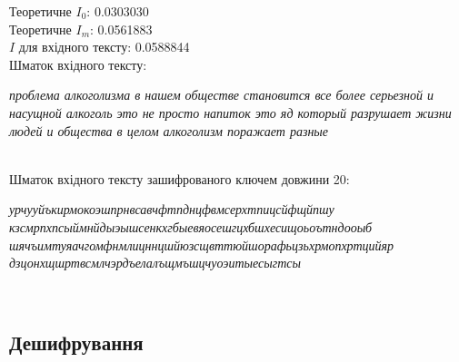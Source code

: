 \documentclass[12pt]{article}
\begin{document}
\quad Теоретичне $I_0$: 0.0303030 \\
    
\quad Теоретичне $I_m$: 0.0561883 \\
    
\quad $I$ для вхідного тексту: 0.0588844 \\
    
Шматок вхідного тексту:
\begin{tcolorbox}[colback=gray!10!white, rounded corners]
    \textit{проблема алкоголизма в нашем обществе становится все более серьезной и насущной алкоголь это не просто напиток это яд который разрушает жизни людей и общества в целом алкоголизм поражает разные}
\end{tcolorbox}\\
    
Шматок вхідного тексту зашифрованого ключем довжини 20:
\begin{tcolorbox}[colback=gray!10!white, rounded corners]
    \textit{урчууйъкирмокоэшпрнвсавчфтпднцфвмсерхтпицсйфщйпшу
    кзсмрпхпсыймнйдыэышсенкхгбыевяосешгцхбшхесищоьоътндооыб
    шячъимтуяачгомфнмлицннцшйюзсщвттюйшорафьцзьхрмопхртцийяр
    дзцонхщшртвсмлчэрдъелалъщмъшцчуоэитыесыгтсы}
\end{tcolorbox}\\
    
\subsection{Дешифрування}
\end{document}

